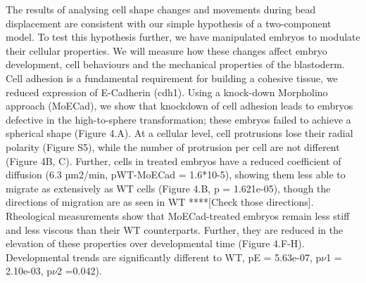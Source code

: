 The results of analysing cell shape changes and movements during bead displacement are consistent with our simple hypothesis of a two-component model.
To test this hypothesis further, we have manipulated embryos to modulate their cellular properties.
We will measure how these changes affect embryo development, cell behaviours and the mechanical properties of the blastoderm.
Cell adhesion is a fundamental requirement for building a cohesive tissue, we reduced expression of E-Cadherin (cdh1).
Using a knock-down Morpholino approach (MoECad), we show that knockdown of cell adhesion leads to embryos defective in the high-to-sphere transformation; these embryos failed to achieve a spherical shape (Figure 4.A).
At a cellular level, cell protrusions lose their radial polarity (Figure S5), while the number of protrusion per cell are not different (Figure 4B, C).
Further, cells in treated embryos have a reduced coefficient of diffusion (6.3 µm2/min, pWT-MoECad = 1.6*10-5), showing them less able to migrate as extensively as WT cells (Figure 4.B, p = 1.621e-05), though the directions of migration are as seen in WT ****[Check those directions].
Rheological measurements show that MoECad-treated embryos remain less stiff and less viscous than their WT counterparts. Further, they are reduced in the elevation of these properties over developmental time (Figure 4.F-H). Developmental trends are significantly different to WT, pE = 5.63e-07, p$\nu$1 = 2.10e-03, p$\nu$2 =0.042).

